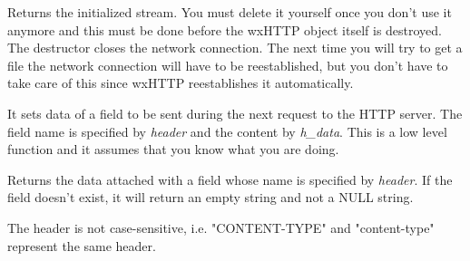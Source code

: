 
Returns the initialized stream. You must delete it yourself once you
don't use it anymore and this must be done before the wxHTTP object itself is
destroyed. The destructor closes the network connection. The next time you will
try to get a file the network connection will have to be reestablished, but you
don't have to take care of this since wxHTTP reestablishes it automatically.




\label{wxhttpsetheader}


It sets data of a field to be sent during the next request to the HTTP server. The field
name is specified by {\it header} and the content by {\it h\_data}.
This is a low level function and it assumes that you know what you are doing.

\label{wxhttpgetheader}


Returns the data attached with a field whose name is specified by {\it header}.
If the field doesn't exist, it will return an empty string and not a NULL string.


The header is not case-sensitive, i.e. "CONTENT-TYPE" and "content-type" 
represent the same header.

